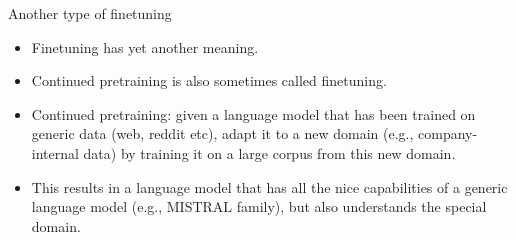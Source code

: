 
\begin{frame}{Another type of finetuning}

\vfill

\begin{itemize}
    \item Finetuning has yet another meaning.
    \item Continued pretraining is also sometimes called
    finetuning.
    \item Continued pretraining: given a language model
that has been    trained on generic data (web, reddit etc),
    adapt it to a new domain (e.g., company-internal data) by
    training it on a large corpus from this new domain.
    \item This results in a language model that has all the
    nice capabilities of a generic language model (e.g.,
    MISTRAL family), but also understands the special domain.
\end{itemize}

\vfill

\end{frame}




%
%	
%
%


%
%
%
%

